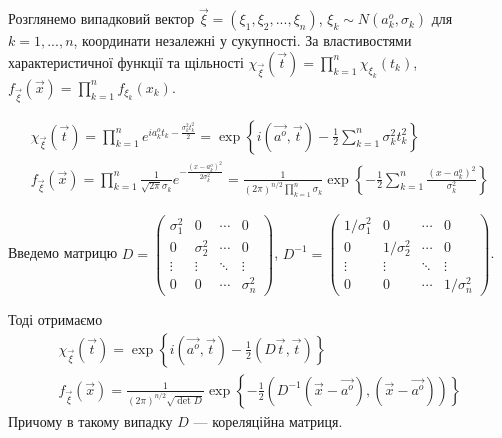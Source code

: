 Розглянемо випадковий вектор $\vec{\xi} = (\xi_1, \xi_2, ..., \xi_n)$, $\xi_k \sim {N}(a_k^o, \sigma_k)$ для $k=1,...,n$, координати незалежні у сукупності.
За властивостями характеристичної функції та щільності $\chi_{\vec{\xi}}(\vec{t}) = \prod\limits_{k=1}^n \chi_{\xi_k}(t_k)$,
$f_{\vec{\xi}}(\vec{x}) = \prod\limits_{k=1}^n f_{\xi_k}(x_k)$.

\begin{gather*}
    \chi_{\vec{\xi}}(\vec{t}) = \prod\limits_{k=1}^n e^{i a_k^o t_k - \frac{\sigma_k^2 t_k^2}{2}} = \exp\left\{i(\vec{a^o}, \vec{t}) - \frac{1}{2}\sum\limits_{k=1}^n \sigma_k^2 t_k^2\right\}
    \\
    f_{\vec{\xi}}(\vec{x}) = \prod\limits_{k=1}^n \frac{1}{\sqrt{2\pi}\sigma_k} e^{-\frac{(x-a_k^o)^2}{2\sigma_k^2}} = \frac{1}{(2\pi)^{n/2}\prod_{k=1}^n \sigma_k} \exp \left\{ -\frac{1}{2} \sum_{k=1}^n \frac{(x-a_k^o)^2}{\sigma_k^2}\right\}
\end{gather*}

Введемо матрицю $D = \begin{pmatrix}
    \sigma_1^2 & 0 & \cdots & 0 \\
    0 & \sigma_2^2 & \cdots & 0 \\
    \vdots & \vdots & \ddots & \vdots \\
    0 & 0 & \cdots & \sigma_n^2
\end{pmatrix}$, $D^{-1} = \begin{pmatrix}
    1/\sigma_1^2 & 0 & \cdots & 0 \\
    0 & 1/\sigma_2^2 & \cdots & 0 \\
    \vdots & \vdots & \ddots & \vdots \\
    0 & 0 & \cdots & 1/\sigma_n^2
\end{pmatrix}$.

\noindent Тоді отримаємо
\begin{gather}
    \chi_{\vec{\xi}}(\vec{t}) = \exp\left\{i(\vec{a^o}, \vec{t}) - \frac{1}{2}(D\vec{t}, \vec{t})\right\}
    \\
    f_{\vec{\xi}}(\vec{x}) = \frac{1}{(2\pi)^{n/2} \sqrt{{\det{D}}}} \exp \left\{ -\frac{1}{2} \left( D^{-1}(\vec{x} - \vec{a^o}), (\vec{x} - \vec{a^o})\right)\right\}
\end{gather}
Причому в такому випадку $D$ --- кореляційна матриця.

